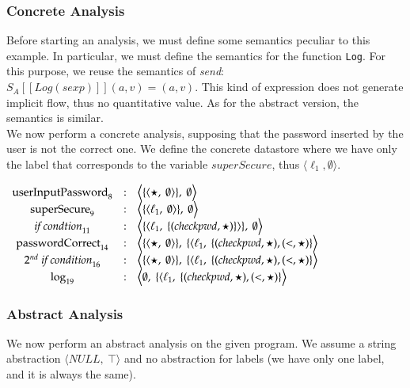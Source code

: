 \documentclass{llncs}
\newcommand{\blangle}{\big\langle}
\newcommand{\brangle}{\big\rangle}
\begin{document}
\subsubsection{Concrete Analysis}
Before starting an analysis, we must define some semantics peculiar to this example. In particular, we must define the semantics for the function \texttt{Log}. For this purpose, we reuse the semantics of \emph{send}: $S_A [\![Log(sexp)]\!](a, v)  =  (a, v)$. This kind of expression does not generate implicit flow, thus no quantitative value. As for the abstract version, the semantics is similar.\\
We now perform a concrete analysis, supposing that the password inserted by the user is not the correct one. We define the concrete datastore where we have only the label that corresponds to the variable $superSecure$, thus $\langle \ell_1, \emptyset \rangle$.

\begin{center}
{\footnotesize$
\begin{array}{ccl}
\mbox{userInputPassword}_{8} &:& \blangle\{\langle \star,\ \emptyset\rangle\},\ \emptyset\brangle\\
\mbox{superSecure}_{9} &:& \blangle\{\langle \ell_1,\ \emptyset\rangle\},\ \emptyset\brangle\\
\mbox{\textit{if condtion}}_{11} &:& \blangle\{\langle \ell_1,\ \{(checkpwd, \star)\}\rangle\},\ \emptyset\brangle\\
\mbox{passwordCorrect}_{14} &:& \blangle\{\langle \star,\ \emptyset\rangle\},\ \{\langle  \ell_1,\ \{(checkpwd, \star), (<, \star)\}\brangle\\
\mbox{\textit{$2^{nd}$ if condition}}_{16} &:& \blangle\{\langle \star,\ \emptyset\rangle\},\ \{\langle  \ell_1,\ \{(checkpwd, \star), (<, \star)\}\brangle\\
\mbox{log}_{19} &:& \blangle\emptyset,\ \{\langle  \ell_1,\ \{(checkpwd, \star), (<, \star)\}\brangle\\
\end{array}$}
\end{center}

\subsubsection{Abstract Analysis}
We now perform an abstract analysis on the given program. We assume a string abstraction $\langle NULL,\ \top \rangle$ and no abstraction for labels (we have only one label, and it is always the same).
\end{document}
